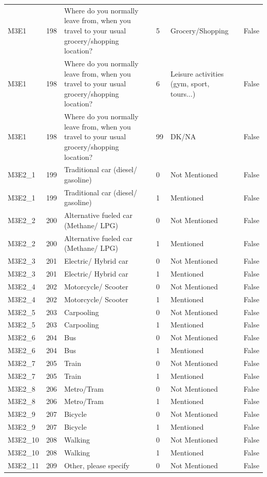 \begin{tabular}{lrlllr}
M3E1 & 198 & Where do you normally leave from, when you travel to your usual grocery/shopping location? & 5 & Grocery/Shopping & False \\
M3E1 & 198 & Where do you normally leave from, when you travel to your usual grocery/shopping location? & 6 & Leisure activities (gym, sport, tours...) & False \\
M3E1 & 198 & Where do you normally leave from, when you travel to your usual grocery/shopping location? & 99 & DK/NA & False \\
M3E2_1 & 199 & Traditional car (diesel/ gasoline) & 0 & Not Mentioned & False \\
M3E2_1 & 199 & Traditional car (diesel/ gasoline) & 1 & Mentioned & False \\
M3E2_2 & 200 & Alternative fueled car (Methane/ LPG) & 0 & Not Mentioned & False \\
M3E2_2 & 200 & Alternative fueled car (Methane/ LPG) & 1 & Mentioned & False \\
M3E2_3 & 201 & Electric/ Hybrid car & 0 & Not Mentioned & False \\
M3E2_3 & 201 & Electric/ Hybrid car & 1 & Mentioned & False \\
M3E2_4 & 202 & Motorcycle/ Scooter & 0 & Not Mentioned & False \\
M3E2_4 & 202 & Motorcycle/ Scooter & 1 & Mentioned & False \\
M3E2_5 & 203 & Carpooling & 0 & Not Mentioned & False \\
M3E2_5 & 203 & Carpooling & 1 & Mentioned & False \\
M3E2_6 & 204 & Bus & 0 & Not Mentioned & False \\
M3E2_6 & 204 & Bus & 1 & Mentioned & False \\
M3E2_7 & 205 & Train & 0 & Not Mentioned & False \\
M3E2_7 & 205 & Train & 1 & Mentioned & False \\
M3E2_8 & 206 & Metro/Tram & 0 & Not Mentioned & False \\
M3E2_8 & 206 & Metro/Tram & 1 & Mentioned & False \\
M3E2_9 & 207 & Bicycle & 0 & Not Mentioned & False \\
M3E2_9 & 207 & Bicycle & 1 & Mentioned & False \\
M3E2_10 & 208 & Walking & 0 & Not Mentioned & False \\
M3E2_10 & 208 & Walking & 1 & Mentioned & False \\
M3E2_11 & 209 & Other, please specify & 0 & Not Mentioned & False \\

\end{tabular}
